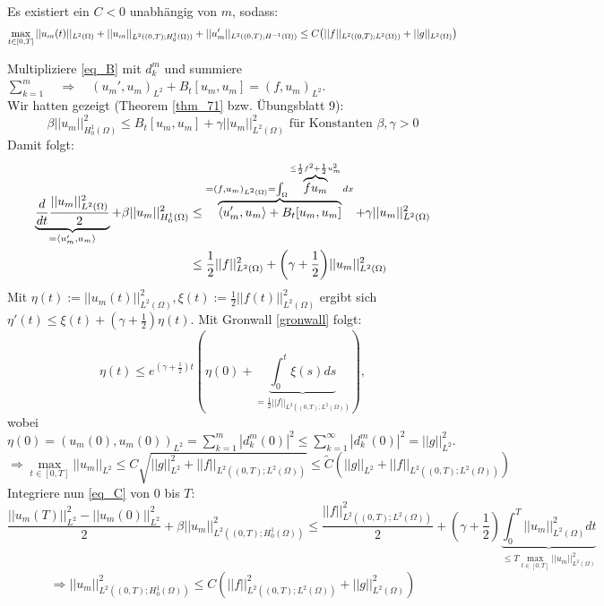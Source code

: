 \begin{thm}[Energieabschätzung]
\label{energieabsch}
	Es existiert ein $C < 0$ unabhängig von $m$, sodass:
	\[ \max_{t \in [0,T]} ||u_m(t)||_{L^2(\Omega)} + ||u_m||_{L^2((0,T);H_0^1(\Omega))} + ||u'_m||_{L^2((0,T);H^{-1}(\Omega))} \leq C \enbrace*{||f||_{L^2((0,T);L^2(\Omega))} + ||g||_{L^2(\Omega)}} \]
\end{thm}
	
	Multipliziere \eqref{eq_B} mit $d_k^m$ und summiere $\sum_{k=1}^m \quad \Rightarrow \quad (u_m',u_m)_{L^2} + B_t[u_m,u_m] = (f,u_m)_{L^2}$. \\
	Wir hatten gezeigt (Theorem \ref{thm_71} bzw. Übungsblatt 9):
	\[ \beta ||u_m||_{H_0^1(\Omega)}^2 \leq B_t[u_m,u_m] + \gamma ||u_m||_{L^2(\Omega)}^2 \text{ für Konstanten } \beta,\gamma > 0 \]
	Damit folgt:
	\begin{equation}
	\begin{aligned}
	\underbrace{\frac{d}{dt} \frac{||u_m||_{L^2(\Omega)}^2}{2}}_{= \langle u_m',u_m \rangle} + \beta ||u_m||_{H_0^1(\Omega)}^2 &\leq \overbrace{\langle u_m',u_m \rangle + B_t[u_m,u_m]}^{=(f,u_m)_{L^2(\Omega)} = \int_{\Omega} \overbrace{f u_m}^{\leq \frac{1}{2} f^2 + \frac{1}{2} u_m^2} dx} + \gamma ||u_m||_{L^2(\Omega)}^2 \\
	&\leq \frac{1}{2} ||f||_{L^2(\Omega)}^2 + \enbrace*{\gamma + \frac{1}{2}} ||u_m||_{L^2(\Omega)}^2 \label{eq_C}
	\end{aligned}
	\end{equation}
	Mit $\eta(t) := ||u_m(t)||_{L^2(\Omega)}^2, \xi(t) := \frac{1}{2} ||f(t)||_{L^2(\Omega)}^2$ ergibt sich $\eta'(t) \leq \xi(t) + (\gamma + \frac{1}{2}) \eta(t)$. Mit Gronwall \ref{gronwall} folgt:
	\[ \eta(t) \leq e^{(\gamma + \frac{1}{2})t} (\eta(0) + \underbrace{\int_{0}^{t} \xi(s) ds}_{= \frac{1}{2} ||f||_{L^2((0,T);L^2(\Omega))}}), \]
	wobei $\eta(0) = (u_m(0),u_m(0))_{L^2} = \sum\limits_{k=1}^{m} |d_k^m(0)|^2 \leq \sum\limits_{k=1}^{\infty} |d_k^m(0)|^2 = ||g||_{L^2}^2$.
	\[ \Rightarrow \max_{t \in [0,T]} ||u_m||_{L^2} \leq C \sqrt{||g||_{L^2}^2 + ||f||_{L^2((0,T);L^2(\Omega))}} \leq \widetilde{C} (||g||_{L^2} + ||f||_{L^2((0,T);L^2(\Omega))}) \]
	Integriere nun \eqref{eq_C} von 0 bis $T$:
	\[ \frac{||u_m(T)||_{L^2}^2 - ||u_m(0)||_{L^2}^2}{2} + \beta ||u_m||_{L^2((0,T);H_0^1(\Omega))}^2 \leq \frac{||f||_{L^2((0,T);L^2(\Omega))}^2}{2} + (\gamma + \frac{1}{2}) \underbrace{\int_{0}^{T} ||u_m||_{L^2(\Omega)}^2 dt}_{\leq T \max_{t \in [0,T]} ||u_m||_{L^2(\Omega)}^2} \]
	\[ \Rightarrow ||u_m||_{L^2((0,T);H_0^1(\Omega))}^2 \leq C (||f||_{L^2((0,T);L^2(\Omega))}^2 + ||g||_{L^2(\Omega)}^2) \]
